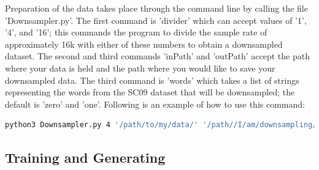 \documentclass[a4paper, titlepage]{article}
\begin{document}
\begin{appendices}
  Preparation of the data takes place through the command line by calling the file 'Downsampler.py'.
  \newline
  \newline
  The first command is 'divider' which can accept values of '1', '4', and '16'; this commands the program to divide the sample rate of approximately 16k with either of these numbers to obtain a downsampled dataset.
  \newline
  \newline
  The second and third commands 'inPath' and 'outPath' accept the path where your data is held and the path where you would like to save your downsampled data.
  \newline
  \newline
  The third command is 'words' which takes a list of strings representing the words from the \ac{SC09} dataset that will be downsampled; the default is 'zero' and 'one'.
  \newline
  \newline
  Following is an example of how to use this command:
  \newline
\begin{lstlisting}[language=bash]
    python3 Downsampler.py 4 '/path/to/my/data/' '/path//I/am/downsampling/to/'
\end{lstlisting}

  \subsection{Training and Generating}


\end{appendices}
\end{document}
